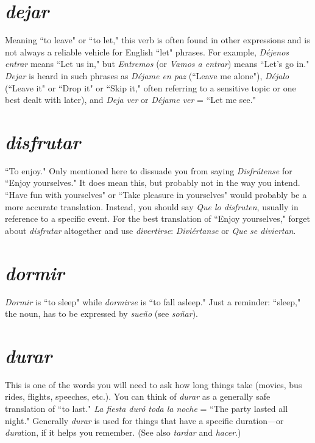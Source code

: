 \section{\emph{dejar}}

Meaning ``to leave" or ``to let," this verb is often found in
other expressions and is not always a reliable vehicle for English ``let"
phrases. For example, \emph{Déjenos entrar} means ``Let us in," but \emph{Entremos}
(or \emph{Vamos a entrar}) means ``Let's go in." \emph{Dejar} is heard in such phrases
as \emph{Déjame en paz} (``Leave me alone"), \emph{Déjalo} (``Leave it" or ``Drop it"
or ``Skip it," often referring to a sensitive topic or one best dealt with
later), and \emph{Deja ver} or \emph{Déjame ver} = ``Let me see."

\section{\emph{disfrutar}}

``To enjoy." Only mentioned here to dissuade you from saying
\emph{Disfrútense} for ``Enjoy yourselves." It does mean this, but probably not
in the way you intend. ``Have fun with yourselves" or ``Take pleasure
in yourselves" would probably be a more accurate translation. Instead,
you should say \emph{Que lo disfruten}, usually in reference to a specific
event. For the best translation of ``Enjoy yourselves," forget about \emph{disfrutar} altogether and use \emph{divertirse}: \emph{Diviértanse} or \emph{Que se diviertan}.

\section{\emph{dormir}}

\emph{Dormir} is ``to sleep" while \emph{dormirse} is ``to fall asleep." Just a
reminder: ``sleep," the noun, has to be expressed by \emph{sueño} (see \emph{soñar}).

\section{\emph{durar}}

This is one of the words you will need to ask how long things
take (movies, bus rides, flights, speeches, etc.). You can think of \emph{durar}
as a generally safe translation of ``to last." \emph{La fiesta duró toda la noche}
= ``The party lasted all night." Generally \emph{durar} is used for things that
have a specific duration---or \emph{dura}tion, if it helps you remember. (See
also \emph{tardar} and \emph{hacer}.)


